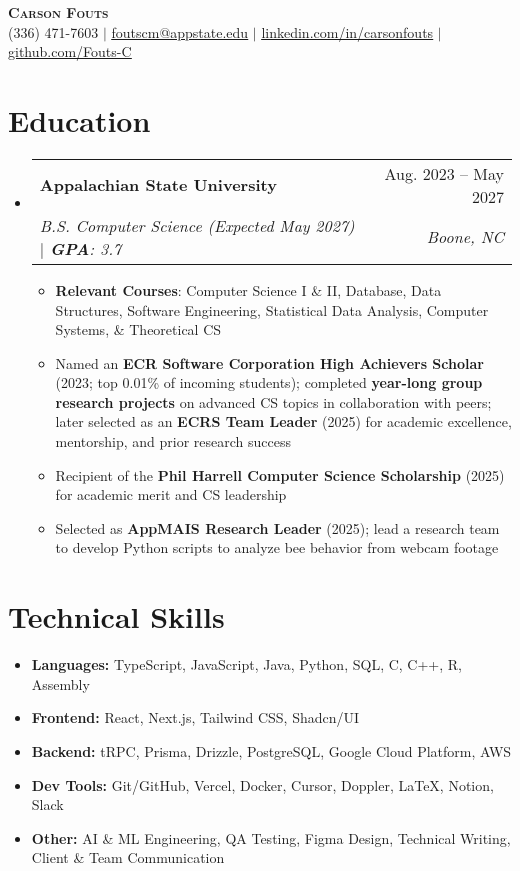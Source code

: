 \documentclass[letterpaper,11pt]{article}
\makeatletter
\newcommand{\resumeItem}[1]{
  \item\small{
    {#1 \vspace{-2pt}}
  }
}
\newcommand{\resumeSubheading}[4]{
  \vspace{-2pt}\item
    \begin{tabular*}{0.97\textwidth}[t]{l@{\extracolsep{\fill}}r}
      \textbf{#1} & #2 \\
      \textit{\small#3} & \textit{\small #4} \\
    \end{tabular*}\vspace{-7pt}
}
\newcommand{\resumeSubHeadingListStart}{\begin{itemize}[leftmargin=0.15in, label={}]}
\newcommand{\resumeSubHeadingListEnd}{\end{itemize}}
\newcommand{\resumeItemListStart}{\begin{itemize}}
\newcommand{\resumeItemListEnd}{\end{itemize}\vspace{-5pt}}
\makeatother
\begin{document}
\begin{center}
    \textbf{\Huge \scshape Carson Fouts} \\ \vspace{1pt}
    \small (336) 471-7603 $|$ \href{mailto:foutscm@appstate.edu}{\underline{foutscm@appstate.edu}} $|$ 
    \href{https://linkedin.com/in/carsonfouts}{\underline{linkedin.com/in/carsonfouts}}
    $|$ 
    \href{https://github.com/Fouts-C}{\underline{github.com/Fouts-C}}
\end{center}

\section{Education}
  \resumeSubHeadingListStart
    \resumeSubheading
      {Appalachian State University}{Aug. 2023 -- May 2027}
      {B.S. Computer Science (Expected May 2027) $|$ \textbf{GPA}: 3.7}
      {Boone, NC}
      \resumeItemListStart
        \resumeItem{\textbf{Relevant Courses}: Computer Science I \& II, Database, Data Structures, Software Engineering, Statistical Data Analysis, Computer Systems, \& Theoretical CS}
        \resumeItem{Named an \textbf{ECR Software Corporation High Achievers Scholar} (2023; top 0.01\% of incoming students); completed \textbf{year-long group research projects} on advanced CS topics in collaboration with peers; later selected as an \textbf{ECRS Team Leader} (2025) for academic excellence, mentorship, and prior research success}
        \resumeItem{Recipient of the \textbf{Phil Harrell Computer Science Scholarship} (2025) for academic merit and CS leadership}
        \resumeItem{Selected as \textbf{AppMAIS Research Leader} (2025); lead a research team to develop Python scripts to analyze bee behavior from webcam footage}
      \resumeItemListEnd
  \resumeSubHeadingListEnd

\section{Technical Skills}
\begin{itemize}[leftmargin=0.15in, label={}]
  \item[] \textbf{Languages:} TypeScript, JavaScript, Java, Python, SQL, C, C++, R, Assembly
  \item[] \textbf{Frontend:} React, Next.js, Tailwind CSS, Shadcn/UI
  \item[] \textbf{Backend:} tRPC, Prisma, Drizzle, PostgreSQL, Google Cloud Platform, AWS
  \item[] \textbf{Dev Tools:} Git/GitHub, Vercel, Docker, Cursor, Doppler, LaTeX, Notion, Slack
  \item[] \textbf{Other:} AI \& ML Engineering, QA Testing, Figma Design, Technical Writing, Client \& Team Communication
\end{itemize}
\end{document}
